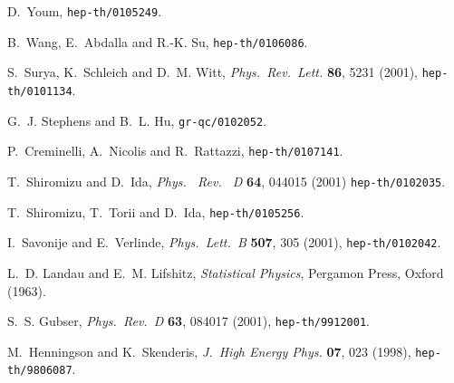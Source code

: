 \documentclass[a4paper,12pt]{article}
\begin{document}
\begin{thebibliography}{10}
D.~Youm, \texttt{hep-th/0105249}.

B.~Wang, E.~Abdalla and R.-K. Su, \texttt{hep-th/0106086}.

S.~Surya, K.~Schleich and D.~M. Witt, \emph{Phys.~Rev.~Lett.} \textbf{86}, 5231
  (2001), \texttt{hep-th/0101134}.

G.~J. Stephens and B.~L. Hu, \texttt{gr-qc/0102052}.

P.~Creminelli, A.~Nicolis and R.~Rattazzi, \texttt{hep-th/0107141}.

T.~Shiromizu and D.~Ida, \emph{Phys.~ Rev. ~D} \textbf{64}, 044015 (2001)
\texttt{hep-th/0102035}.

T.~Shiromizu, T.~Torii and D.~Ida,
\texttt{hep-th/0105256}.


I.~Savonije and E.~Verlinde, \emph{Phys.~Lett.~B} \textbf{507}, 305 (2001),
  \texttt{hep-th/0102042}.

L.~D. Landau and E.~M. Lifshitz, \emph{Statistical Physics}, Pergamon Press,
  Oxford (1963).

S.~S. Gubser, \emph{Phys.~Rev.~D} \textbf{63}, 084017 (2001),
  \texttt{hep-th/9912001}.

M.~Henningson and K.~Skenderis, \emph{J.~High Energy Phys.} \textbf{07}, 023
  (1998), \texttt{hep-th/9806087}.

\end{thebibliography}
\end{document}
